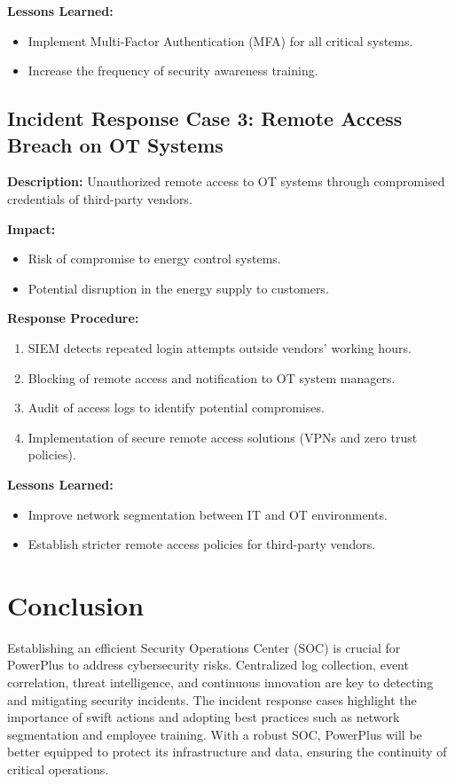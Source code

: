 \textbf{Lessons Learned:}
\begin{itemize}
    \item Implement Multi-Factor Authentication (MFA) for all critical systems.
    \item Increase the frequency of security awareness training.
\end{itemize}

\subsection{Incident Response Case 3: Remote Access Breach on OT Systems}

\textbf{Description:}  
Unauthorized remote access to OT systems through compromised credentials of third-party vendors.

\textbf{Impact:}  
\begin{itemize}
    \item Risk of compromise to energy control systems.
    \item Potential disruption in the energy supply to customers.
\end{itemize}

\textbf{Response Procedure:}
\begin{enumerate}
    \item SIEM detects repeated login attempts outside vendors' working hours.
    \item Blocking of remote access and notification to OT system managers.
    \item Audit of access logs to identify potential compromises.
    \item Implementation of secure remote access solutions (VPNs and zero trust policies).
\end{enumerate}

\textbf{Lessons Learned:}
\begin{itemize}
    \item Improve network segmentation between IT and OT environments.
    \item Establish stricter remote access policies for third-party vendors.
\end{itemize}

\section*{Conclusion}

Establishing an efficient Security Operations Center (SOC) is crucial for PowerPlus to address cybersecurity risks. Centralized log collection, event correlation, threat intelligence, and continuous innovation are key to detecting and mitigating security incidents. The incident response cases highlight the importance of swift actions and adopting best practices such as network segmentation and employee training. With a robust SOC, PowerPlus will be better equipped to protect its infrastructure and data, ensuring the continuity of critical operations.




